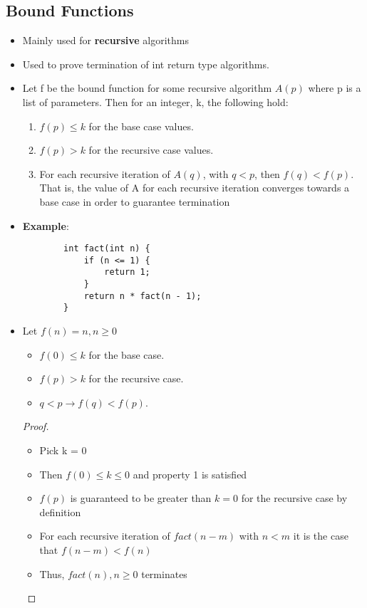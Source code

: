 \documentclass[10pt, 
a4paper, 
oneside, 
headinclude, footinclude, 
BCOR5mm]
{scrartcl}
\begin{document}
\subsection{Bound Functions}
\begin{itemize}
    \item Mainly used for \textbf{recursive} algorithms
    \item Used to prove termination of int return type algorithms.
    \item Let f be the bound function for some recursive algorithm $A(p)$ where p is a list of parameters. Then for an
    integer, k, the following hold:
    \begin{enumerate} 
        \item $f(p) \leq k$ for the base case values.
        \item $f(p) > k$ for the recursive case values.
        \item For each recursive iteration of $A(q)$, with $q < p$, then $f(q) < f(p)$. That is, the value of A for each
        recursive iteration converges towards a base case in order to guarantee termination
    \end{enumerate}
    \item \textbf{Example}:
    \begin{lstlisting}
        int fact(int n) {
            if (n <= 1) {
                return 1;
            }
            return n * fact(n - 1);
        }
    \end{lstlisting}
    \item Let $f(n) = n, n \geq 0$
    \begin{itemize}
        \item $f(0) \leq k$ for the base case.
        \item $f(p) > k$ for the recursive case.
        \item $q < p \rightarrow f(q) < f(p)$.
    \end{itemize}
    \begin{proof}
        \begin{itemize}
            \item Pick k = 0
            \item Then $f(0) \leq k \leq 0$ and property 1 is satisfied
            \item $f(p)$ is guaranteed to be greater than $k = 0$ for the recursive case by definition
            \item For each recursive iteration of $fact(n - m)$ with $n < m$ it is the case that $f(n - m) < f(n)$
            \item Thus, $fact(n), n \geq 0$ terminates
        \end{itemize}
    \end{proof}
\end{itemize}
\newpage
\end{document}
